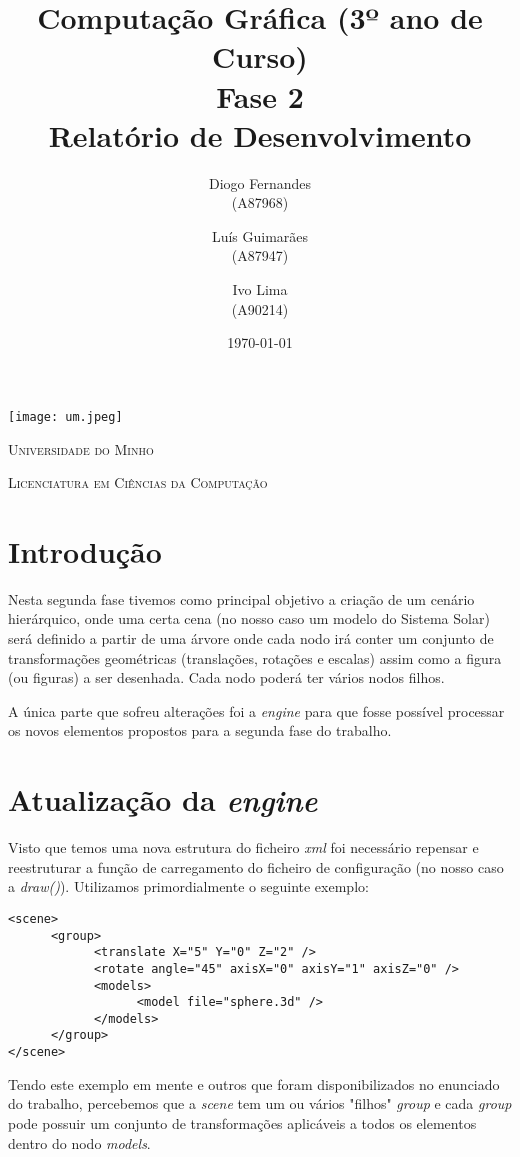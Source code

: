 \documentclass[11pt,a4paper]{report}
\title{Computação Gráfica (3º ano de Curso)\\
       \textbf{Fase 2}\\ Relatório de Desenvolvimento
       } %
\author{Diogo Fernandes\\ (A87968) \and Luís Guimarães\\ (A87947)
         \and Ivo Lima\\ (A90214)
       } %
\date{\today} %
\begin{document}
	\begin{minipage}{0.9\linewidth}
        \centering
		\texttt{[image: um.jpeg]}\par\vspace{1cm}
		{\scshape\LARGE Universidade do Minho} \par
		\vspace{0.6cm}
		{\scshape\Large Licenciatura em Ciências da Computação} \par
		\maketitle
	\end{minipage}

\tableofcontents %

\chapter{Introdução}

Nesta segunda fase tivemos como principal objetivo a criação de um cenário hierárquico, onde uma certa cena (no nosso caso um modelo do Sistema Solar) será definido a partir de uma árvore onde cada nodo irá conter um conjunto de transformações geométricas (translações, rotações e escalas) assim como a figura (ou figuras) a ser desenhada. Cada nodo poderá ter vários nodos filhos.

A única parte que sofreu alterações foi a \emph{engine} para que fosse possível processar os novos elementos propostos para a segunda fase do trabalho.

\chapter{Atualização da \emph{engine}}
Visto que temos uma nova estrutura do ficheiro \emph{xml} foi necessário repensar e reestruturar a função de carregamento do ficheiro de configuração (no nosso caso a \emph{draw()}). Utilizamos primordialmente o seguinte exemplo:

\begin{lstlisting}[style = xml]
<scene>
      <group>
            <translate X="5" Y="0" Z="2" />
            <rotate angle="45" axisX="0" axisY="1" axisZ="0" />
            <models>
                  <model file="sphere.3d" />
            </models>
      </group>
</scene>
\end{lstlisting}

Tendo este exemplo em mente e outros que foram disponibilizados no enunciado do trabalho, percebemos que a \emph{scene} tem um ou vários "filhos" \emph{group} e cada \emph{group} pode possuir um conjunto de transformações aplicáveis a todos os elementos dentro do nodo \emph{models}.
\end{document}

